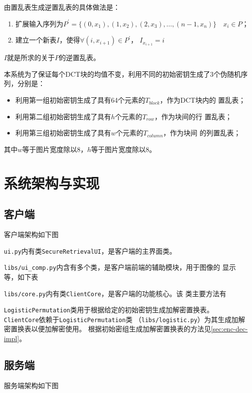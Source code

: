 由置乱表生成逆置乱表的具体做法是：
\begin{enumerate}
  \item 扩展输入序列为$P^\prime = \{(0, x_1), (1, x_2), (2, x_3),
      \dotsc, (n - 1, x_n)\} \quad x_i \in P$；
  \item 建立一个新表$I$，使得$\forall (i, x_{i + 1}) \in P^\prime$，
      $I_{x_{i + 1}} = i$
\end{enumerate}
$I$就是所求的关于$P$的逆置乱表。

本系统为了保证每个DCT块的均值不变，利用不同的初始密钥生成了3个伪随机序列，分别是：
\begin{itemize}
  \item 利用第一组初始密钥生成了具有64个元素的$T_{block}$，作为DCT块内的
    置乱表；
  \item 利用第二组初始密钥生成了具有$h$个元素的$T_{row}$，作为块间的行
    置乱表；
  \item 利用第三组初始密钥生成了具有$w$个元素的$T_{column}$，作为块间
    的列置乱表；
\end{itemize}
其中$w$等于图片宽度除以$8$，$h$等于图片宽度除以$8$。

\section{系统架构与实现}
\label{sec:sys-arch}
\subsection{客户端}
客户端架构如下图


\texttt{ui.py}内有类\texttt{SecureRetrievalUI}，是客户端的主界面类。

\texttt{libs/ui\_comp.py}内含有多个类，是客户端前端的辅助模块，用于图像的
显示等，如下表


\texttt{libs/core.py}内有类\texttt{ClientCore}，是客户端的功能核心。该
类主要方法有


\texttt{LogisticPermutation}类用于根据给定的初始密钥生成加解密置换表。
\texttt{ClientCore}依赖于\texttt{LogisticPermutation}类
（\texttt{libs/logistic.py}）为其生成加解密置换表以便加解密使用。
根据初始密组生成加解密置换表的方法见\ref{sec:enc-dec-impl}。

\subsection{服务端}
服务端架构如下图


